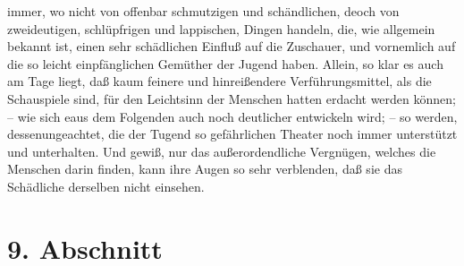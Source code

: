immer, wo nicht von offenbar schmutzigen und schändlichen, deoch von zweideutigen, schlüpfrigen und lappischen, Dingen handeln, die, wie allgemein bekannt ist, einen sehr schädlichen Einfluß auf die Zuschauer, und vornemlich auf die so leicht einpfänglichen Gemüther der Jugend haben. Allein, so klar es auch am Tage liegt, daß kaum feinere und hinreißendere Verführungsmittel, als die Schauspiele sind, für den Leichtsinn der Menschen hatten erdacht werden können; -- wie sich eaus dem Folgenden auch noch deutlicher entwickeln wird; -- so werden, dessenungeachtet, die der Tugend so gefährlichen Theater noch immer unterstützt und unterhalten. Und gewiß, nur das außerordendliche Vergnügen, welches die Menschen darin finden, kann ihre Augen so sehr verblenden, daß sie das Schädliche derselben nicht einsehen.

\section{9. Abschnitt}


